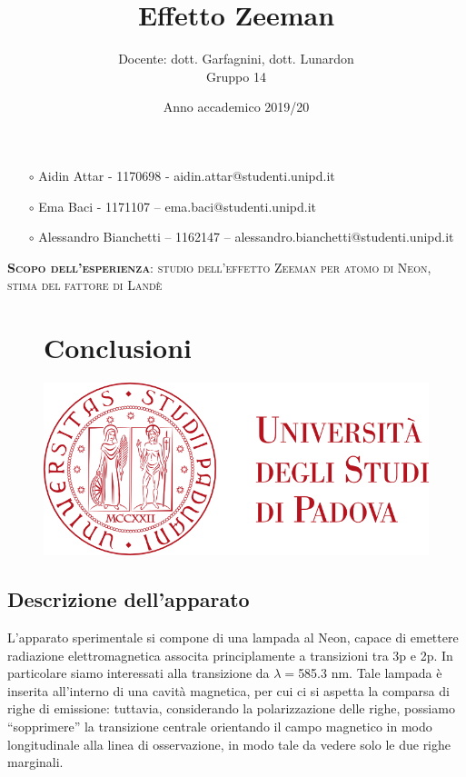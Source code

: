\documentclass{article}
\title{Effetto Zeeman}
\author{Docente: dott. Garfagnini, dott. Lunardon \\
Gruppo 14}
\date{Anno accademico 2019/20}
\begin{document}
\maketitle

    \begin{itemize}
        \item[$\circ$] Aidin Attar - 1170698 - aidin.attar@studenti.unipd.it
        \item[$\circ$] Ema Baci - 1171107 – ema.baci@studenti.unipd.it
        \item[$\circ$] Alessandro Bianchetti – 1162147 – alessandro.bianchetti@studenti.unipd.it
    \end{itemize}

\vspace{3 cm}
\begin{large}\textsc{\textbf{Scopo dell'esperienza}: studio dell'effetto Zeeman per atomo di Neon, stima del fattore di Landè} 
\end{large}
\vspace{8.5cm}

\begin{figure}[H]
\centering
\section{Conclusioni}\includegraphics[scale = 0.5 , angle=0]{unipd_logo.png}
\end{figure}


\twocolumn

\subsection*{Descrizione dell'apparato} 

L'apparato sperimentale si compone di una lampada al Neon, capace di emettere
radiazione elettromagnetica associta principlamente a transizioni tra 3p e 2p.
In particolare siamo interessati alla transizione da $\lambda = $585.3 nm.
Tale lampada è inserita all'interno di una cavità magnetica, per cui ci si 
aspetta la comparsa di righe di emissione: tuttavia, considerando la 
polarizzazione delle righe, possiamo “sopprimere” la transizione centrale
orientando il campo magnetico in modo longitudinale alla linea di 
osservazione, in modo tale da vedere solo le due righe marginali. 
\end{document}
